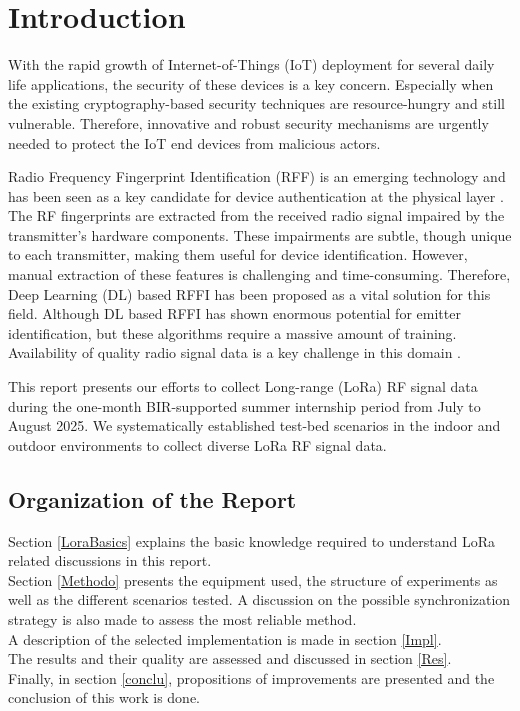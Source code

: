 \documentclass[a4paper, 12pt]{article}
\begin{document}
%

\section{Introduction} \label{sec:intro}

With the rapid growth of Internet-of-Things (IoT) deployment for several daily life applications, the security of these devices is a key concern. Especially when the existing cryptography-based security techniques are resource-hungry and still vulnerable. Therefore, innovative and robust security mechanisms are urgently needed to protect the IoT end devices from malicious actors. 

Radio Frequency Fingerprint Identification (RFF) is an emerging technology and has been seen as a key candidate for device authentication at the physical layer \cite{AqeelSurvey}. The RF fingerprints are extracted from the received radio signal impaired by the transmitter's hardware components. These impairments are subtle, though unique to each transmitter, making them useful for device identification. However, manual extraction of these features is challenging and time-consuming. Therefore, Deep Learning (DL) based RFFI has been proposed as a vital solution for this field. Although DL based RFFI has shown enormous potential for emitter identification, but these algorithms require a massive amount of training. Availability of quality radio signal data is a key challenge in this domain \cite{AqeelSurvey}.

This report presents our efforts to collect Long-range (LoRa) RF signal data during the one-month BIR-supported summer internship period from July to August 2025. We systematically established test-bed scenarios in the indoor and outdoor environments to collect diverse LoRa RF signal data. 

\subsection{Organization of the Report}

Section \ref{LoraBasics} explains the basic knowledge required to understand LoRa related discussions in this report.\\
Section \ref{Methodo} presents the equipment used, the structure of experiments as well as the different scenarios tested. A discussion on the possible synchronization strategy is also made to assess the most reliable method.\\
A description of the selected implementation is made in section \ref{Impl}.\\
The results and their quality are assessed and discussed in section \ref{Res}.\\
Finally, in section \ref{conclu}, propositions of improvements are presented and the conclusion of this work is done.
\end{document}
